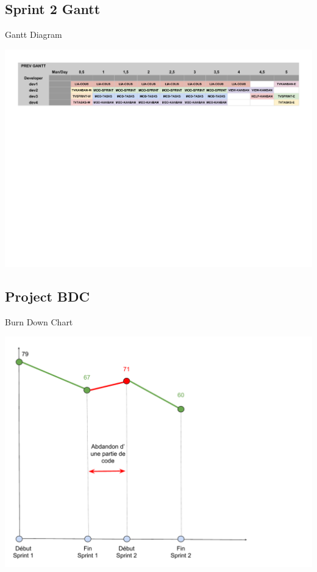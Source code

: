 \documentclass{beamer}
\begin{document}
\subsection{Sprint 2 Gantt}

\begin{frame}{Gantt Diagram}
	\begin{center}
        \includegraphics[scale=0.412]{Gantt3.pdf}
        \end{center}
\end{frame}

\subsection{Project BDC}

\begin{frame}{Burn Down Chart}
	\begin{center}
        \includegraphics[scale=0.35]{BDC.pdf}
        \end{center}
\end{frame}
\end{document}
